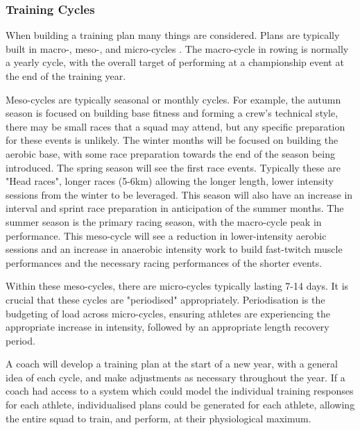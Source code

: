 \subsubsection{Training Cycles}
When building a training plan many things are considered. Plans are typically built in macro-, meso-, and micro-cycles \cite{periodisation}. The macro-cycle in rowing is normally a yearly cycle, with the overall target of performing at a championship event at the end of the training year. 

Meso-cycles are typically seasonal or monthly cycles. For example, the autumn season is focused on building base fitness and forming a crew's technical style, there may be small races that a squad may attend, but any specific preparation for these events is unlikely. The winter months will be focused on building the aerobic base, with some race preparation towards the end of the season being introduced. The spring season will see the first race events. Typically these are "Head races", longer races (5-6km) allowing the longer length, lower intensity sessions from the winter to be leveraged. This season will also have an increase in interval and sprint race preparation in anticipation of the summer months. The summer season is the primary racing season, with the macro-cycle peak in performance. This meso-cycle will see a reduction in lower-intensity aerobic sessions and an increase in anaerobic intensity work to build fast-twitch muscle performances and the necessary racing performances of the shorter events.

Within these meso-cycles, there are micro-cycles typically lasting 7-14 days. It is crucial that these cycles are "periodised" appropriately. Periodisation is the budgeting of load across micro-cycles, ensuring athletes are experiencing the appropriate increase in intensity, followed by an appropriate length recovery period.

A coach will develop a training plan at the start of a new year, with a general idea of each cycle, and make adjustments as necessary throughout the year. If a coach had access to a system which could model the individual training responses for each athlete, individualised plans could be generated for each athlete, allowing the entire squad to train, and perform, at their physiological maximum. 

